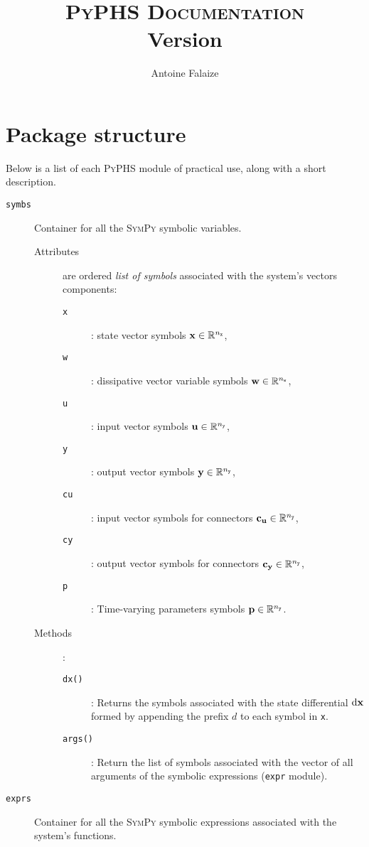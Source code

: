\documentclass[10pt,a4paper]{article}
\author{Antoine Falaize}
\title{\textsc{PyPHS Documentation}\\ Version \version}
\begin{document}

%
\maketitle
%
%
\section{Package structure}
%
Below is a list of each \textsc{PyPHS} module of practical use, along with a short description.
%
\begin{description}
%
\item[\texttt{symbs}] Container for all the \textsc{SymPy} symbolic variables. 
\begin{description}
%
\item[Attributes] are ordered \emph{list of symbols} associated with the system's vectors components:
%
\begin{description}
\item[\texttt{x}]: state vector symbols ${\mathbf{x}} \in \mathbb{R}^{{n_{\mathtt{x}}}}$,
\item[\texttt{w}]: dissipative vector variable symbols ${\mathbf{w}}\in\mathbb{R}^{{n_{\mathtt{w}}}}$,
\item[\texttt{u}]: input vector symbols ${\mathbf{u}}\in\mathbb{R}^{n_{\mathtt{y}}}$,
\item[\texttt{y}]: output vector symbols ${\mathbf{y}} \in \mathbb{R}^{n_{\mathtt{y}}}$,
\item[\texttt{cu}]: input vector symbols for connectors $\mathbf{c_u}\in\mathbb{R}^{n_{\mathtt{y}}}$,
\item[\texttt{cy}]: output vector symbols for connectors $\mathbf{c_y}\in\mathbb{R}^{n_{\mathtt{y}}}$,
\item[\texttt{p}]: Time-varying parameters symbols ${\mathbf{p}}\in \mathbb{R}^{n_{\mathtt{y}}}$.
\end{description}
%
\item[Methods]:
%
\begin{description}
%
\item[\texttt{dx()}]: Returns the symbols associated with the state differential $\mathrm{d}{\mathbf{x}}$ formed by appending the prefix $d$ to each symbol in \texttt{x}.
%
\item[\texttt{args()}]: Return the list of symbols associated with the vector of all arguments of the symbolic expressions (\texttt{expr} module).
%
\end{description}
%
\end{description}
%
\item[\texttt{exprs}] Container for all the \textsc{SymPy} symbolic expressions associated with the system's functions. 
\begin{description}

\end{description}
\end{description}
\end{document}
